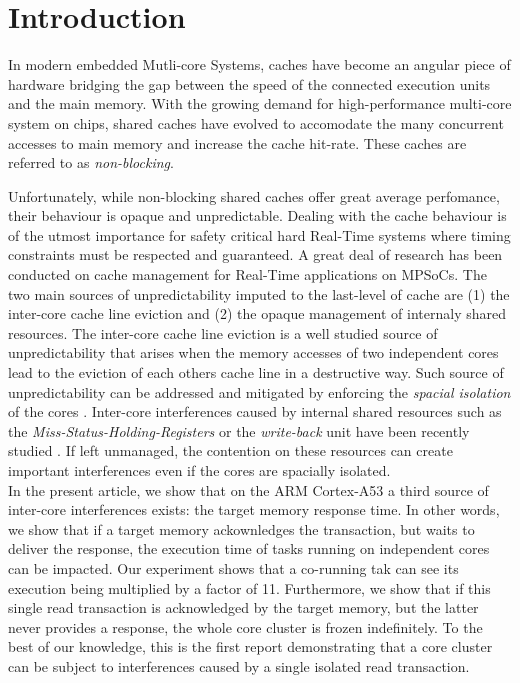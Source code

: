 \section{Introduction}
    In modern embedded Mutli-core Systems, caches have become an angular piece of hardware bridging the gap between the speed of the connected execution units and the main memory.
    With the growing demand for high-performance multi-core system on chips, shared caches have evolved to accomodate the many concurrent accesses to main memory and increase the cache hit-rate.
    These caches are referred to as \emph{non-blocking}.

    Unfortunately, while non-blocking shared caches offer great average perfomance, their behaviour is opaque and unpredictable.
    Dealing with the cache behaviour is of the utmost importance for safety critical hard Real-Time systems where timing constraints must be respected and guaranteed.
    A great deal of research has been conducted on cache management for Real-Time applications on MPSoCs.
    The two main sources of unpredictability imputed to the last-level of cache are (1) the inter-core cache line eviction and (2) the opaque management of internaly shared resources.
    The inter-core cache line eviction is a well studied source of unpredictability that arises when the memory accesses of two independent cores lead to the eviction of each others cache line in a destructive way.
    Such source of unpredictability can be addressed and mitigated by enforcing the \emph{spacial isolation} of the cores \cite{Mancuso2013RealtimeCM, 6755286}.
    Inter-core interferences caused by internal shared resources such as the \emph{Miss-Status-Holding-Registers} or the \emph{write-back} unit have been recently studied \cite{Valsan2017AddressingIC, Heechul_DDOS_attacks_on_shared_cache}.
    If left unmanaged, the contention on these resources can create important interferences even if the cores are spacially isolated.\\

    In the present article, we show that on the ARM Cortex-A53 \cite{ARM-cortex-A53} a third source of inter-core interferences exists: the target memory response time.
    In other words, we show that if a target memory ackownledges the transaction, but waits to deliver the response, the execution time of tasks running on independent cores can be impacted.
    Our experiment shows that a co-running tak can see its execution being multiplied by a factor of 11.
    Furthermore, we show that if this single read transaction is acknowledged by the target memory, but the latter never provides a response, the whole core cluster is frozen indefinitely.
    To the best of our knowledge, this is the first report demonstrating that a core cluster can be subject to interferences caused by a single isolated read transaction.
